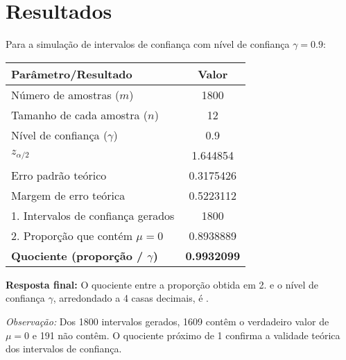 \documentclass[11pt,a4paper]{article}
\begin{document}
\section*{Resultados}

\begin{tcolorbox}[colback=green!5!white,colframe=green!75!black,title=Solução]
Para a simulação de intervalos de confiança com nível de confiança \( \gamma = 0.9 \):

\begin{center}
\begin{tabular}{|l|c|}
\hline
\textbf{Parâmetro/Resultado} & \textbf{Valor} \\
\hline
Número de amostras (\( m \)) & 1800 \\
Tamanho de cada amostra (\( n \)) & 12 \\
Nível de confiança (\( \gamma \)) & 0.9 \\
\( z_{\alpha/2} \) & 1.644854 \\
\hline
Erro padrão teórico & 0.3175426 \\
Margem de erro teórica & 0.5223112 \\
\hline
1. Intervalos de confiança gerados & 1800 \\
2. Proporção que contém \( \mu = 0 \) & 0.8938889 \\
\hline
\textbf{Quociente (proporção / \( \gamma \))} & \textbf{0.9932099} \\
\hline
\end{tabular}
\end{center}

\vspace{0.5cm}
\textbf{Resposta final:} O quociente entre a proporção obtida em 2. e o nível de confiança \( \gamma \), arredondado a 4 casas decimais, é .

\vspace{0.3cm}
\textit{Observação:} Dos 1800 intervalos gerados, 1609 contêm o verdadeiro valor de \( \mu = 0 \) e 191 não contêm. O quociente próximo de 1 confirma a validade teórica dos intervalos de confiança.
\end{tcolorbox}
\end{document}

